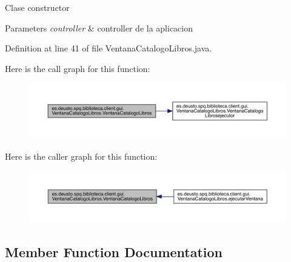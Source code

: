 Clase constructor 
\begin{DoxyParams}{Parameters}
{\em controller} & controller de la aplicacion \\
\hline
\end{DoxyParams}


Definition at line 41 of file Ventana\+Catalogo\+Libros.\+java.

Here is the call graph for this function\+:
\nopagebreak
\begin{figure}[H]
\begin{center}
\leavevmode
\includegraphics[width=350pt]{classes_1_1deusto_1_1spq_1_1biblioteca_1_1client_1_1gui_1_1_ventana_catalogo_libros_ad3299c3f43b2d7df44242a0db622f313_cgraph}
\end{center}
\end{figure}
Here is the caller graph for this function\+:
\nopagebreak
\begin{figure}[H]
\begin{center}
\leavevmode
\includegraphics[width=350pt]{classes_1_1deusto_1_1spq_1_1biblioteca_1_1client_1_1gui_1_1_ventana_catalogo_libros_ad3299c3f43b2d7df44242a0db622f313_icgraph}
\end{center}
\end{figure}


\subsection{Member Function Documentation}
\mbox{\label{classes_1_1deusto_1_1spq_1_1biblioteca_1_1client_1_1gui_1_1_ventana_catalogo_libros_af65b1282e021cad1b3502774d5269674}} 
